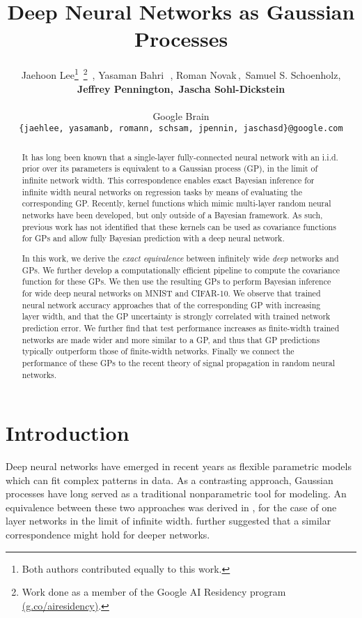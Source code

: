 \documentclass{article} %
\title{Deep Neural Networks as Gaussian Processes}
\author{Jaehoon Lee\thanks{Both authors contributed equally to this work.} \,\thanks{Work done as a member of the Google AI Residency program \href{https://g.co/airesidency}{(g.co/airesidency)}.}\, , Yasaman Bahri\samethanks[1] \,\samethanks[2]\, , Roman Novak\,, \,Samuel S. Schoenholz, \\ \textbf{Jeffrey Pennington, \,Jascha Sohl-Dickstein}\\ \\
Google Brain\\ 
  \small{\texttt{\{jaehlee, yasamanb, romann, schsam, jpennin, jaschasd\}@google.com}} \\
 }
\renewcommand*{\thefootnote}{\fnsymbol{footnote}}
\begin{document}
\maketitle

\begin{abstract}


It has long been known that a single-layer fully-connected neural network with an i.i.d. prior over its parameters is equivalent to a Gaussian process (GP), in the limit of infinite network width. This correspondence enables exact Bayesian inference for infinite width neural networks on regression tasks by means of 
evaluating the corresponding GP. Recently, kernel functions which mimic multi-layer random neural networks have been developed, but only outside of a Bayesian framework. As such, previous work has not identified that these kernels can be used as covariance functions for GPs and allow fully Bayesian prediction with a deep neural network. 

In this work, we derive the {\em exact equivalence} between infinitely wide {\em deep} networks and GPs. We further develop a computationally efficient pipeline to compute the covariance function for these GPs. We then use the resulting GPs to perform Bayesian inference for wide deep neural networks on MNIST and CIFAR-10. We observe that trained neural network accuracy approaches that of the corresponding GP with increasing layer width, and that the GP uncertainty is strongly correlated with trained network prediction error. We further find that test performance increases as finite-width trained networks are made wider and more similar to a GP, and thus that GP predictions typically outperform those of finite-width networks. 
Finally we connect the performance of these GPs to the recent theory of signal propagation in random neural networks.


\end{abstract}
\renewcommand*{\thefootnote}{\arabic{footnote}}

\section{Introduction}

Deep neural networks have emerged in recent years as flexible parametric models which can fit complex patterns in data. As a contrasting approach, Gaussian processes have long served as a traditional nonparametric tool for modeling. An equivalence between these two approaches was derived in \cite{neal}, for the case of one layer networks in the limit of infinite width. \citet{neal} further suggested that a similar correspondence might hold for deeper networks. 
\end{document}
